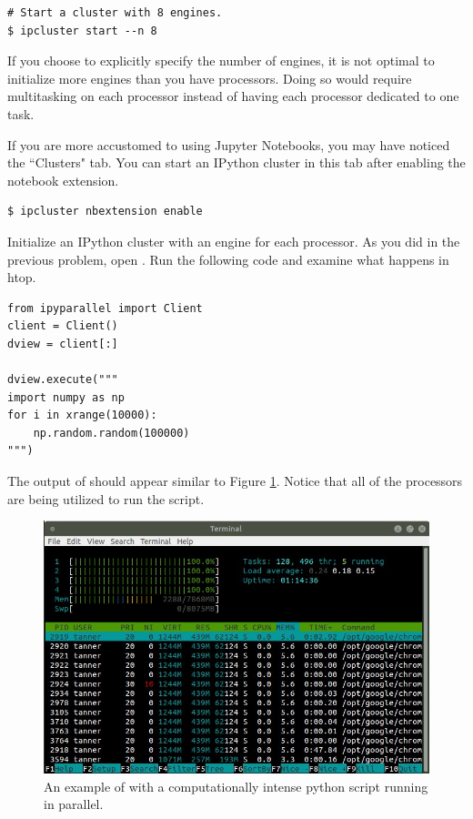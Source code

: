 \begin{lstlisting}
# Start a cluster with 8 engines.
$ ipcluster start --n 8
\end{lstlisting}

If you choose to explicitly specify the number of engines, it is not optimal to initialize more engines than you have processors. Doing so would require multitasking on each processor instead of having each processor dedicated to one task.

If you are more accustomed to using Jupyter Notebooks, you may have noticed the ``Clusters" tab. You can start an IPython cluster in this tab after enabling the  notebook extension.

\begin{lstlisting}
$ ipcluster nbextension enable
\end{lstlisting}

\begin{problem}
Initialize an IPython cluster with an engine for each processor. As you did in the previous problem, open . Run the following code and examine what happens in htop.

\begin{lstlisting}
from ipyparallel import Client
client = Client()
dview = client[:]

dview.execute("""
import numpy as np
for i in xrange(10000):
    np.random.random(100000)
""")
\end{lstlisting}

The output of  should appear similar to Figure \ref{fig:htop_cluster}. Notice that all of the processors are being utilized to run the script.
\end{problem}

\begin{figure}
    \includegraphics[width=\textwidth]{cluster_active.jpg}
\caption{An example of  with a computationally intense python script running in parallel.}
\label{fig:htop_cluster}
\end{figure}

